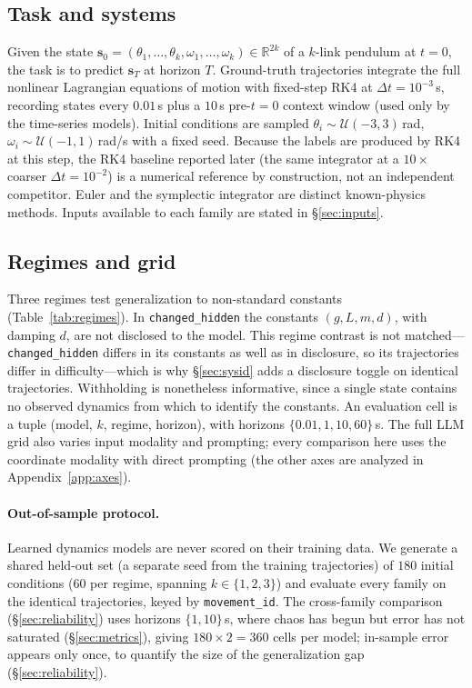 \documentclass{article}
\begin{document}
\subsection{Task and systems}
Given the state $\mathbf{s}_0=(\theta_1,\dots,\theta_k,\omega_1,\dots,\omega_k)\in
\mathbb{R}^{2k}$ of a $k$-link pendulum at $t{=}0$, the task is to predict $\mathbf{s}_T$ at
horizon $T$. Ground-truth trajectories integrate the full nonlinear Lagrangian equations of
motion with fixed-step RK4 at $\Delta t{=}10^{-3}$\,s, recording states every $0.01$\,s plus
a $10$\,s pre-$t{=}0$ context window (used only by the time-series models). Initial
conditions are sampled $\theta_i\sim\mathcal{U}(-3,3)$\,rad,
$\omega_i\sim\mathcal{U}(-1,1)$\,rad/s with a fixed seed. Because the labels are produced by
RK4 at this step, the RK4 baseline reported later (the same integrator at a $10{\times}$
coarser $\Delta t{=}10^{-2}$) is a numerical reference by construction, not an independent
competitor. Euler and the symplectic integrator are distinct known-physics methods. Inputs
available to each family are stated in \S\ref{sec:inputs}.

\subsection{Regimes and grid}
Three regimes test generalization to non-standard constants (Table~\ref{tab:regimes}). In
\texttt{changed\_hidden} the constants $(g,L,m,d)$, with damping $d$, are not disclosed to the
model. This regime contrast is not matched---\texttt{changed\_hidden} differs in its constants
as well as in disclosure, so its trajectories differ in difficulty---which is why \S\ref{sec:sysid}
adds a disclosure toggle on identical trajectories. Withholding is nonetheless informative,
since a single state contains no observed dynamics from which to identify the constants. An evaluation cell is a tuple (model, $k$, regime,
horizon), with horizons $\{0.01,1,10,60\}$\,s. The full LLM grid also varies input modality
and prompting; every comparison here uses the coordinate modality with direct prompting
(the other axes are analyzed in Appendix~\ref{app:axes}).

\paragraph{Out-of-sample protocol.} Learned dynamics models are never scored on their training
data. We generate a shared held-out set (a separate seed from the training trajectories) of
$180$ initial conditions ($60$ per regime, spanning $k\in\{1,2,3\}$) and evaluate every
family on the identical trajectories, keyed by \texttt{movement\_id}. The cross-family
comparison (\S\ref{sec:reliability}) uses horizons $\{1,10\}$\,s, where chaos has begun but
error has not saturated (\S\ref{sec:metrics}), giving $180\times2=360$ cells per model;
in-sample error appears only once, to quantify the size of the generalization gap
(\S\ref{sec:reliability}).
\end{document}
